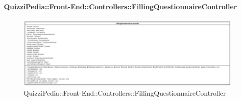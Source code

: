 \paragraph[QuizziPedia::Front-End::Controllers\\::FillingQuestionnaireController]{QuizziPedia::Front-End::Controllers::FillingQuestionnaireController}
\begin{figure} [ht]
	\centering
	\includegraphics[scale=0.25]{UML/Classi/Front-End/QuizziPedia_Front-end_Controller_FillingQuestionnaireController.png}
	\caption{QuizziPedia::Front-End::Controllers::FillingQuestionnaireController}
\end{figure} \FloatBarrier
